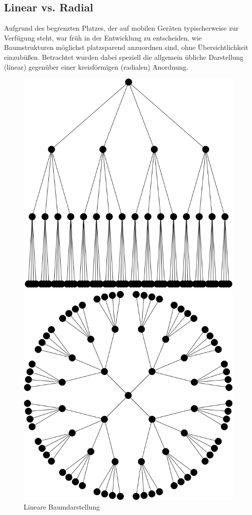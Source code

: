 \subsection{Linear vs. Radial}
Aufgrund des begrenzten Platzes, der auf mobilen Geräten typischerweise zur Verfügung steht, war früh in der Entwicklung zu entscheiden, wie Baumstrukturen möglichst platzsparend anzuordnen sind, ohne Übersichtlichkeit einzubüßen. Betrachtet wurden dabei speziell die allgemein übliche Darstellung (linear) gegenüber einer kreisförmigen (radialen) Anordnung.\\
\begin{figure}
	\centering
	\begin{minipage}{.5\textwidth}
		\centering
		\includegraphics[width=.9\linewidth]{../screenshots/lineargraphexample.PNG}
		\caption{Lineare Baumdarstellung}
		\label{abb:linearbaum}
	\end{minipage}%
	\begin{minipage}{.5\textwidth}
		\centering
		\includegraphics[width=.9\linewidth]{../screenshots/radialgraphexample.PNG}

\end{minipage}
\end{figure}
